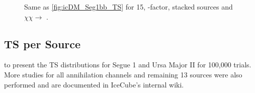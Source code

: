 \begin{figure}
    \caption{Same as \cref{fig:icDM_Seg1bb_TS} for 15, \GS \J-factor, stacked sources and $\chi\chi \rightarrow$ \parpar{\nu_\mu}.}
    \label{fig:icDM_stact_numu_TS}
\end{figure}

\subsection{TS per Source} \label{sec:icDM_TSperSrc}

 to  present the TS distributions for Segue 1 and Ursa Major II for 100,000 trials.
More studies for all annihilation channels and remaining 13 sources were also performed and are documented in IceCube's internal wiki.

